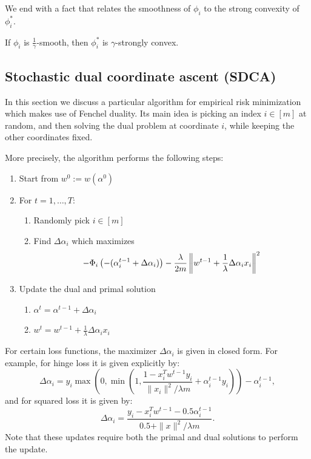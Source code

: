We end with a fact that relates the smoothness of $\phi_i$ to the strong convexity of $\phi_i^*$.

\begin{fact}
If $\phi_i$ is $\frac{1}{\gamma}$-smooth, then $\phi^*_i$ is $\gamma$-strongly convex.
\end{fact}

\subsection{Stochastic dual coordinate ascent (SDCA)}

In this section we discuss a particular algorithm for empirical risk minimization which makes use of Fenchel duality. Its main idea is picking an index $i\in[m]$ at random, and then solving the dual problem at coordinate $i$, while keeping the other coordinates fixed.

More precisely, the algorithm performs the following steps:
\begin{enumerate}
\item Start from $w^0:=w(\alpha^0)$
\item For $t=1,\dots, T$:
    \begin{enumerate}
        \item Randomly pick $i\in[m]$
        \item Find $\Delta\alpha_i$ which maximizes
        $$-\Phi_i\left(-(\alpha_i^{t-1}+\Delta\alpha_i)\right)-\frac{\lambda}{2m}\left\lVert w^{t-1}+\frac{1}{\lambda}\Delta\alpha_ix_i\right\rVert^2$$
    \end{enumerate}
\item Update the dual and primal solution
    \begin{enumerate}
        \item $\alpha^t = \alpha^{t-1}+\Delta\alpha_i$
        \item $w^t = w^{t-1} + \frac{1}{\lambda} \Delta\alpha_ix_i$
    \end{enumerate}
\end{enumerate}
For certain loss functions, the maximizer $\Delta\alpha_i$ is given in closed form. For example, for hinge loss it is given explicitly by:
$$\Delta\alpha_i = y_i\max\left(0,\min(1,\frac{1-x_i^Tw^{t-1}y_i}{\|x_i\|^2/\lambda m} + \alpha_i^{t-1}y_i)\right) - \alpha_i^{t-1},$$
and for squared loss it is given by:
$$\Delta\alpha_i = \frac{y_i - x_i^Tw^{t-1} - 0.5\alpha_i^{t-1}}{0.5 + \|x\|^2/\lambda m}.$$
Note that these updates require both the primal and dual solutions to perform the update.

